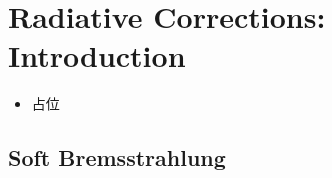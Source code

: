 \chapter{Radiative Corrections: Introduction}

\begin{itemize}
  \item 占位
\end{itemize}
\pagestyle{general}

\section{Soft Bremsstrahlung}